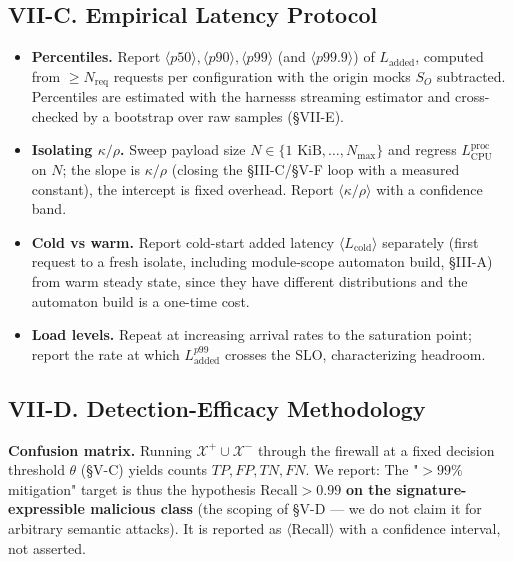 \subsection{VII-C. Empirical Latency
Protocol}\label{vii-c-empirical-latency-protocol}

\begin{itemize}
\tightlist
\item
  \textbf{Percentiles.} Report
  \(\langle p50\rangle, \langle p90\rangle, \langle p99\rangle\) (and
  \(\langle p99.9\rangle\)) of \(L_{\text{added}}\), computed from
  \(\ge N_{\text{req}}\) requests per configuration with the origin
  mock\textquotesingle s \(S_O\) subtracted. Percentiles are estimated
  with the harness\textquotesingle s streaming estimator and
  cross-checked by a bootstrap over raw samples (§VII-E).
\item
  \textbf{Isolating \(\kappa/\rho\).} Sweep payload size
  \(N\in\{1\text{ KiB},\dots,N_{\max}\}\) and regress
  \(L_{\text{CPU}}^{\text{proc}}\) on \(N\); the slope is
  \(\kappa/\rho\) (closing the §III-C/§V-F loop with a measured
  constant), the intercept is fixed overhead. Report
  \(\langle\kappa/\rho\rangle\) with a confidence band.
\item
  \textbf{Cold vs warm.} Report cold-start added latency
  \(\langle L_{\text{cold}}\rangle\) separately (first request to a
  fresh isolate, including module-scope automaton build, §III-A) from
  warm steady state, since they have different distributions and the
  automaton build is a one-time cost.
\item
  \textbf{Load levels.} Repeat at increasing arrival rates to the
  saturation point; report the rate at which \(L_{\text{added}}^{p99}\)
  crosses the SLO, characterizing headroom.
\end{itemize}

\subsection{VII-D. Detection-Efficacy
Methodology}\label{vii-d-detection-efficacy-methodology}

\textbf{Confusion matrix.} Running
\(\mathcal{X}^{+}\cup\mathcal{X}^{-}\) through the firewall at a fixed
decision threshold \(\theta\) (§V-C) yields counts \(TP, FP, TN, FN\).
We report:
 The "\(>99\%\) mitigation" target
is thus the hypothesis \(\text{Recall}>0.99\) \textbf{on the
signature-expressible malicious class} (the scoping of §V-D --- we do
not claim it for arbitrary semantic attacks). It is reported as
\(\langle\text{Recall}\rangle\) with a confidence interval, not
asserted.

